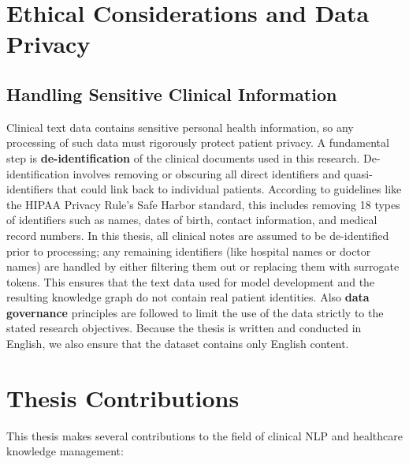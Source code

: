 \section{Ethical Considerations and Data Privacy}

\subsection{Handling Sensitive Clinical Information}

Clinical text data contains sensitive personal health information, so any processing of such data must rigorously protect patient privacy. A fundamental step is \textbf{de-identification} of the clinical documents used in this research. De-identification involves removing or obscuring all direct identifiers and quasi-identifiers that could link back to individual patients. According to guidelines like the HIPAA Privacy Rule's Safe Harbor standard, this includes removing 18 types of identifiers such as names, dates of birth, contact information, and medical record numbers. In this thesis, all clinical notes are assumed to be de-identified prior to processing; any remaining identifiers (like hospital names or doctor names) are handled by either filtering them out or replacing them with surrogate tokens. This ensures that the text data used for model development and the resulting knowledge graph do not contain real patient identities. Also \textbf{data governance} principles are followed to limit the use of the data strictly to the stated research objectives. Because the thesis is written and conducted in English, we also ensure that the dataset contains only English content.


\section{Thesis Contributions}

This thesis makes several contributions to the field of clinical NLP and healthcare knowledge management:

